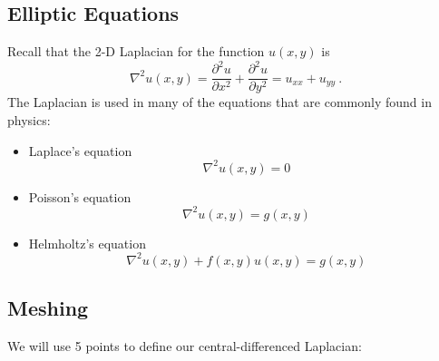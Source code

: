 \documentclass[12pt, answers]{exam}
\begin{document}
\subsection*{Elliptic Equations}

Recall that the 2-D Laplacian for the function $u(x,y)$ is
%
\begin{equation}
\nabla^2 u(x,y) = \frac{\partial^2 u}{\partial x^2} + \frac{\partial^2 u}{\partial y^2} = u_{xx} + u_{yy} \:.\nonumber
\end{equation}
%
The Laplacian is used in many of the equations that are commonly found in physics:
%
\begin{itemize}
\item Laplace's equation
\[\nabla^2 u(x,y) = 0\]

\item Poisson's equation 
\[\nabla^2 u(x,y) = g(x,y)\]

\item Helmholtz's equation
\[\nabla^2 u(x,y) +f(x,y)u(x,y) = g(x,y)\]
\end{itemize}

\subsection*{Meshing}

We will use 5 points to define our central-differenced Laplacian:
\end{document}
